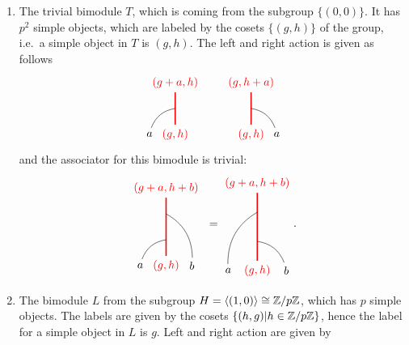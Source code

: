 	\begin{enumerate}
		\item The trivial bimodule $T$, which is coming from the subgroup $\{(0,0)\}$. It has $p^2$ simple objects, which are labeled by the cosets $\{(g,h)\}$ of the group, i.e.\ a simple object in $T$ is $(g,h)$. The left and right action is given as follows
			\begin{equation}
				\begin{tikzpicture}[scale=0.8,baseline=(current bounding box.center)]
				\node[red](m) at (0,0) {$(g,h)$};
				\node(b) at (-1,0) {$a$};
				\node[red](abm) at (0,2) {$(g+a,h)$};
				\draw[red,line width=0.4mm] (m)-- (abm);
				\draw (b) to [bend left] (0,1);
				\end{tikzpicture}\hspace{20pt}
				\begin{tikzpicture}[scale=0.8,baseline=(current bounding box.center)]
				\node[red](m) at (0,0) {$(g,h)$};
				\node(b) at (1,0) {$a$};
				\node[red](abm) at (0,2) {$(g,h+a)$};
				\draw[red,line width=0.4mm] (m)-- (abm);
				\draw (b) to [bend right] (0,1);
				\end{tikzpicture}
			\end{equation}
		\noindent
		and the associator for this bimodule is trivial:
			\begin{equation}
				\begin{tikzpicture}[scale=0.8,baseline=(current bounding box.center)]
				\node[red](m) at (0,0) {$(g,h)$};
				\node(a) at (-1,0) {$a$};
				\node(b) at (1,0) {$b$};
				\node[red](abm) at (0,3) {$(g+a,h+b)$};
				\draw[red,line width=0.4mm] (m) -- (abm);
				\draw (a) to [bend left] (0,1);
				\draw (b) to [bend right] (0,2);
				\end{tikzpicture}\ =
				\begin{tikzpicture}[scale=0.9,baseline=(current bounding box.center)]
				\node[red](m) at (0,0) {$(g,h)$};
				\node(a) at (-1,0) {$a$};
				\node(b) at (1,0) {$b$};
				\node[red](abm) at (0,3) {$(g+a,h+b)$};
				\draw[red,line width=0.4mm] (m) -- (abm);
				\draw (b) to [bend right] (0,1);
				\draw (a) to [bend left] (0,2);
				\end{tikzpicture}.
			\end{equation}
		\item The bimodule $L$ from the subgroup $H=\langle(1,0)\rangle\cong \mathbb{Z}/p\mathbb{Z}$, which has $p$ simple objects. The labels are given by the cosets $\{(h,g)|h\in\mathbb{Z}/p\mathbb{Z}\}$, hence the label for a simple object in $L$ is $g$. Left and right action are given by 

\end{enumerate}
